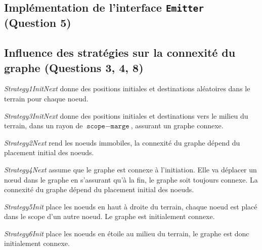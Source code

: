 \documentclass[a4paper]{article}
\begin{document}
\subsection{Implémentation de l'interface \texttt{Emitter} (Question 5)}

\subsection{Influence des stratégies sur la connexité du graphe (Questions 3, 4, 8)}
\begin{minipage}{0.45\textwidth}


  \textsl{Strategy1InitNext} donne des positions initiales et destinations
aléatoires dans le terrain pour chaque noeud.

\textsl{Strategy3InitNext} donne des positions initiales et
    destinations vers le milieu du terrain, dans un rayon de $ \texttt{scope} -
\texttt{marge} $, assurant un graphe
    connexe.

    \textsl{Strategy2Next} rend les noeuds immobiles, la connexité du
      graphe dépend du placement initial des noeuds.

     \textsl{Strategy4Next} assume que le graphe est connexe à
    l'initiation. Elle va déplacer un nœud dans le graphe en
    s'assurant qu'à la fin, le graphe soit toujours connexe. La
    connexité du graphe dépend du placement initial des noeuds.

    \textsl{Strategy5Init} place les noeuds en haut à droite du terrain,
      chaque noeud est placé dans le scope d'un autre noeud.
      Le graphe est initialement connexe.

      \textsl{Strategy6Init} place les noeuds en étoile au milieu du
        terrain, le graphe est donc initialement connexe.\\

\end{minipage}%
\hfill
\end{document}
